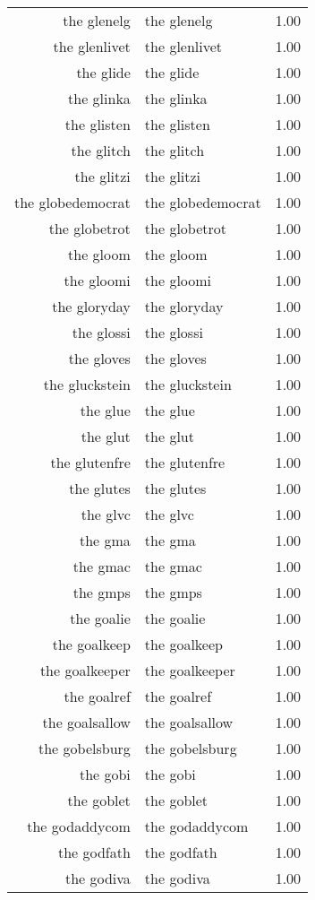 \begin{table}[ht]
\begin{tabular}{rlr}
  the glenelg & the glenelg & 1.00 \\ 
  the glenlivet & the glenlivet & 1.00 \\ 
  the glide & the glide & 1.00 \\ 
  the glinka & the glinka & 1.00 \\ 
  the glisten & the glisten & 1.00 \\ 
  the glitch & the glitch & 1.00 \\ 
  the glitzi & the glitzi & 1.00 \\ 
  the globedemocrat & the globedemocrat & 1.00 \\ 
  the globetrot & the globetrot & 1.00 \\ 
  the gloom & the gloom & 1.00 \\ 
  the gloomi & the gloomi & 1.00 \\ 
  the gloryday & the gloryday & 1.00 \\ 
  the glossi & the glossi & 1.00 \\ 
  the gloves & the gloves & 1.00 \\ 
  the gluckstein & the gluckstein & 1.00 \\ 
  the glue & the glue & 1.00 \\ 
  the glut & the glut & 1.00 \\ 
  the glutenfre & the glutenfre & 1.00 \\ 
  the glutes & the glutes & 1.00 \\ 
  the glvc & the glvc & 1.00 \\ 
  the gma & the gma & 1.00 \\ 
  the gmac & the gmac & 1.00 \\ 
  the gmps & the gmps & 1.00 \\ 
  the goalie & the goalie & 1.00 \\ 
  the goalkeep & the goalkeep & 1.00 \\ 
  the goalkeeper & the goalkeeper & 1.00 \\ 
  the goalref & the goalref & 1.00 \\ 
  the goalsallow & the goalsallow & 1.00 \\ 
  the gobelsburg & the gobelsburg & 1.00 \\ 
  the gobi & the gobi & 1.00 \\ 
  the goblet & the goblet & 1.00 \\ 
  the godaddycom & the godaddycom & 1.00 \\ 
  the godfath & the godfath & 1.00 \\ 
  the godiva & the godiva & 1.00 \\ 

\end{tabular}
\end{table}
